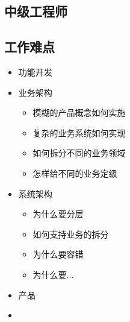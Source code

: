\documentclass[11pt,a4paper]{article}
\begin{document}
\subsection*{中级工程师}
\label{sec:orge02befa}

\subsection*{工作难点}
\label{sec:org150f4f8}
\begin{itemize}
\item 功能开发

\item 业务架构
\begin{itemize}
\item 模糊的产品概念如何实施
\item 复杂的业务系统如何实现
\item 如何拆分不同的业务领域
\item 怎样给不同的业务定级
\end{itemize}

\item 系统架构
\begin{itemize}
\item 为什么要分层

\item 如何支持业务的拆分

\item 为什么要容错

\item 为什么要...
\end{itemize}

\item 产品

\item
\end{itemize}
\end{document}
